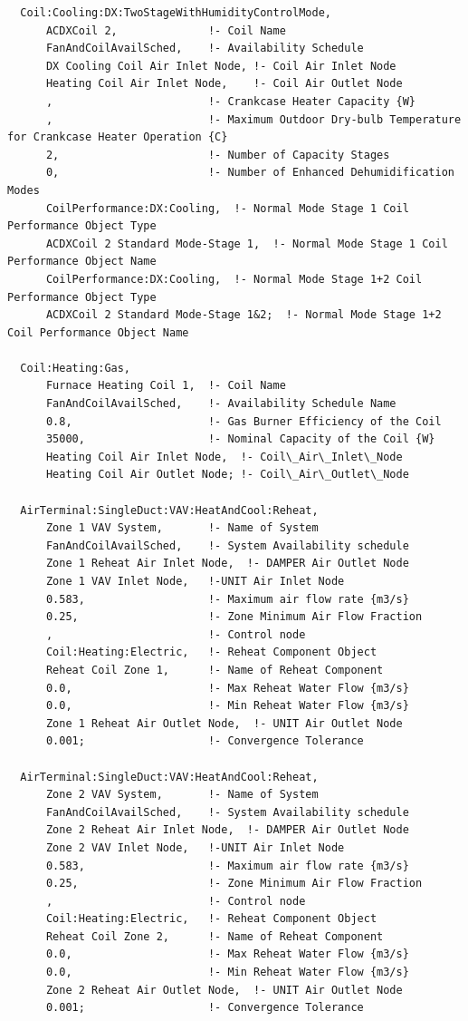 \begin{lstlisting}
  Coil:Cooling:DX:TwoStageWithHumidityControlMode,
      ACDXCoil 2,              !- Coil Name
      FanAndCoilAvailSched,    !- Availability Schedule
      DX Cooling Coil Air Inlet Node, !- Coil Air Inlet Node
      Heating Coil Air Inlet Node,    !- Coil Air Outlet Node
      ,                        !- Crankcase Heater Capacity {W}
      ,                        !- Maximum Outdoor Dry-bulb Temperature for Crankcase Heater Operation {C}
      2,                       !- Number of Capacity Stages
      0,                       !- Number of Enhanced Dehumidification Modes
      CoilPerformance:DX:Cooling,  !- Normal Mode Stage 1 Coil Performance Object Type
      ACDXCoil 2 Standard Mode-Stage 1,  !- Normal Mode Stage 1 Coil Performance Object Name
      CoilPerformance:DX:Cooling,  !- Normal Mode Stage 1+2 Coil Performance Object Type
      ACDXCoil 2 Standard Mode-Stage 1&2;  !- Normal Mode Stage 1+2 Coil Performance Object Name

  Coil:Heating:Gas,
      Furnace Heating Coil 1,  !- Coil Name
      FanAndCoilAvailSched,    !- Availability Schedule Name
      0.8,                     !- Gas Burner Efficiency of the Coil
      35000,                   !- Nominal Capacity of the Coil {W}
      Heating Coil Air Inlet Node,  !- Coil\_Air\_Inlet\_Node
      Heating Coil Air Outlet Node; !- Coil\_Air\_Outlet\_Node

  AirTerminal:SingleDuct:VAV:HeatAndCool:Reheat,
      Zone 1 VAV System,       !- Name of System
      FanAndCoilAvailSched,    !- System Availability schedule
      Zone 1 Reheat Air Inlet Node,  !- DAMPER Air Outlet Node
      Zone 1 VAV Inlet Node,   !-UNIT Air Inlet Node
      0.583,                   !- Maximum air flow rate {m3/s}
      0.25,                    !- Zone Minimum Air Flow Fraction
      ,                        !- Control node
      Coil:Heating:Electric,   !- Reheat Component Object
      Reheat Coil Zone 1,      !- Name of Reheat Component
      0.0,                     !- Max Reheat Water Flow {m3/s}
      0.0,                     !- Min Reheat Water Flow {m3/s}
      Zone 1 Reheat Air Outlet Node,  !- UNIT Air Outlet Node
      0.001;                   !- Convergence Tolerance

  AirTerminal:SingleDuct:VAV:HeatAndCool:Reheat,
      Zone 2 VAV System,       !- Name of System
      FanAndCoilAvailSched,    !- System Availability schedule
      Zone 2 Reheat Air Inlet Node,  !- DAMPER Air Outlet Node
      Zone 2 VAV Inlet Node,   !-UNIT Air Inlet Node
      0.583,                   !- Maximum air flow rate {m3/s}
      0.25,                    !- Zone Minimum Air Flow Fraction
      ,                        !- Control node
      Coil:Heating:Electric,   !- Reheat Component Object
      Reheat Coil Zone 2,      !- Name of Reheat Component
      0.0,                     !- Max Reheat Water Flow {m3/s}
      0.0,                     !- Min Reheat Water Flow {m3/s}
      Zone 2 Reheat Air Outlet Node,  !- UNIT Air Outlet Node
      0.001;                   !- Convergence Tolerance


\end{lstlisting}
